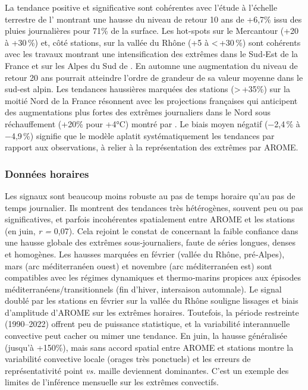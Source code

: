 \documentclass[
  article,
  nofooter,
  noheadings]{jss}
\begin{document}
La tendance positive et significative sont cohérentes avec l'étude à
l'échelle terrestre de l'\citet{IPCC2021} montrant une hausse du niveau
de retour 10 ans de +6,7\% issu des pluies journalières pour 71\% de la
surface. Les hot-spots sur le Mercantour (+20 à +30\,\%) et, côté
stations, sur la vallée du Rhône (+5 à \textless\,+30\,\%) sont
cohérents avec les travaux montrant une intensification des extrêmes
dans le Sud‑Est de la France et sur les Alpes du Sud de
\citet{blanchet2021explaining}. En automne une augmentation du niveau de
retour 20 ans pourrait atteindre l'ordre de grandeur de sa valeur
moyenne dans le sud‑est alpin. Les tendances haussières marquées des
stations (\textgreater\,+35\%) sur la moitié Nord de la France résonnent
avec les projections françaises qui anticipent des augmentations plus
fortes des extrêmes journaliers dans le Nord sous réchauffement (+20\%
pour +4°C) montré par \citet{soubeyroux:hal-04991790}. Le biais moyen
négatif (−2,4\,\% à −4,9\,\%) signifie que le modèle aplatit
systématiquement les tendances par rapport aux observations, à relier à
la représentation des extrêmes par AROME.

\subsubsection{Données horaires}\label{donnuxe9es-horaires-1}

Les signaux sont beaucoup moins robuste au pas de temps horaire qu'au
pas de temps journalier. Ils montrent des tendances très hétérogènes,
souvent peu ou pas significatives, et parfois incohérentes spatialement
entre AROME et les stations (en juin, \emph{r =} 0,07). Cela rejoint le
constat de \citet{IPCC2021} concernant la faible confiance dans une
hausse globale des extrêmes sous‑journaliers, faute de séries longues,
denses et homogènes. Les hausses marquées en février (vallée du Rhône,
pré‑Alpes), mars (arc méditerranéen ouest) et novembre (arc
méditerranéen est) sont compatibles avec les régimes dynamiques et
thermo‑marins propices aux épisodes méditerranéens/transitionnels (fin
d'hiver, intersaison automnale). Le signal doublé par les stations en
février sur la vallée du Rhône souligne lissages et biais d'amplitude
d'AROME sur les extrêmes horaires. Toutefois, la période restreinte
(1990--2022) offrent peu de puissance statistique, et la variabilité
interannuelle convective peut cacher ou mimer une tendance. En juin, la
hausse généralisée (jusqu'à +150\%), mais sans accord spatial entre
AROME et stations montre la variabilité convective locale (orages très
ponctuels) et les erreurs de représentativité point \emph{vs.} maille
deviennent dominantes. C'est un exemple des limites de l'inférence
mensuelle sur les extrêmes convectifs.\\
\end{document}
